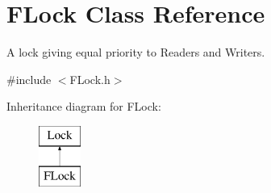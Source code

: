 \hypertarget{class_f_lock}{}\section{F\+Lock Class Reference}
\label{class_f_lock}


A lock giving equal priority to Readers and Writers.  




{\ttfamily \#include $<$F\+Lock.\+h$>$}

Inheritance diagram for F\+Lock\+:\begin{figure}[H]
\begin{center}
\leavevmode
\includegraphics[height=2.000000cm]{class_f_lock}
\end{center}
\end{figure}
